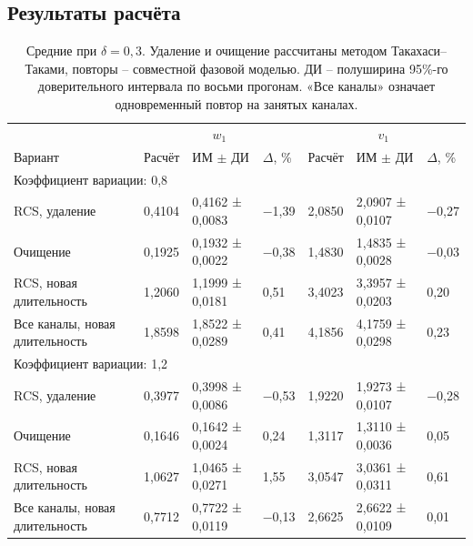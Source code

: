 \documentclass[a4paper,12pt]{article}
\begin{document}
\subsection{Результаты расчёта}
\begin{table}[!htbp]
\centering\small\setlength{\tabcolsep}{2pt}
\begin{tabular}{@{}p{4.16cm}p{1.61cm}p{2.83cm}p{1.28cm}p{1.61cm}p{2.83cm}p{1.28cm}@{}}
\toprule
 & \multicolumn{3}{c}{$w_1$} & \multicolumn{3}{c}{$v_1$} \\
Вариант & Расчёт & ИМ $\pm$ ДИ & $\Delta$, \% & Расчёт & ИМ $\pm$ ДИ & $\Delta$, \% \\
\midrule
\multicolumn{7}{l}{Коэффициент вариации: 0,8} \\
RCS, удаление & 0,4104 & 0,4162 ± 0,0083 & −1,39 & 2,0850 & 2,0907 ± 0,0107 & −0,27 \\
Очищение & 0,1925 & 0,1932 ± 0,0022 & −0,38 & 1,4830 & 1,4835 ± 0,0028 & −0,03 \\
RCS, новая длительность & 1,2060 & 1,1999 ± 0,0181 & 0,51 & 3,4023 & 3,3957 ± 0,0203 & 0,20 \\
Все каналы, новая длительность & 1,8598 & 1,8522 ± 0,0289 & 0,41 & 4,1856 & 4,1759 ± 0,0298 & 0,23 \\
\multicolumn{7}{l}{Коэффициент вариации: 1,2} \\
RCS, удаление & 0,3977 & 0,3998 ± 0,0086 & −0,53 & 1,9220 & 1,9273 ± 0,0107 & −0,28 \\
Очищение & 0,1646 & 0,1642 ± 0,0024 & 0,24 & 1,3117 & 1,3110 ± 0,0036 & 0,05 \\
RCS, новая длительность & 1,0627 & 1,0465 ± 0,0271 & 1,55 & 3,0547 & 3,0361 ± 0,0311 & 0,61 \\
Все каналы, новая длительность & 0,7712 & 0,7722 ± 0,0119 & −0,13 & 2,6625 & 2,6622 ± 0,0109 & 0,01 \\
\bottomrule
\end{tabular}
\caption{Средние при $\delta=0{,}3$. Удаление и очищение рассчитаны методом Такахаси--Таками, повторы -- совместной фазовой моделью. ДИ -- полуширина 95\%-го доверительного интервала по восьми прогонам. «Все каналы» означает одновременный повтор на занятых каналах.}
\label{tab:results}
\end{table}
\end{document}
